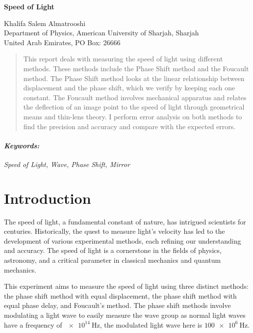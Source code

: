 \documentclass[12pt]{article}
\begin{document}
	
	\begin{titlepage}
		\begin{center}
			\begin{Large}
				\textbf{Speed of Light} \\
			\end{Large}
			\vspace{0.5cm}
			Khalifa Salem Almatrooshi \\
			\vspace{0.5cm}
			Department of Physics, American University of Sharjah, Sharjah \\
			United Arab Emirates, PO Box: 26666
		\end{center}
		\begin{abstract}
			\noindent
			This report deals with measuring the speed of light using different methods. These methods include the Phase Shift method and the Foucault method. The Phase Shift method looks at the linear relationship between displacement and the phase shift, which we verify by keeping each one constant. The Foucault method involves mechanical apparatus and relates the deflection of an image point to the speed of light through geometrical means and thin-lens theory. I perform error analysis on both methods to find the precision and accuracy and compare with the expected errors.
		\end{abstract}
		\paragraph{\textit{Keywords:}} \textit{Speed of Light, Wave, Phase Shift, Mirror}
	\end{titlepage}
	
\clearpage
	
	\section{Introduction}
	
	The speed of light, a fundamental constant of nature, has intrigued scientists for centuries. Historically, the quest to measure light's velocity has led to the development of various experimental methods, each refining our understanding and accuracy. The speed of light is a cornerstone in the fields of physics, astronomy, and a critical parameter in classical mechanics and quantum mechanics.
	
	This experiment aims to measure the speed of light using three distinct methods: the phase shift method with equal displacement, the phase shift method with equal phase delay, and Foucault's method. The phase shift methods involve modulating a light wave to easily measure the wave group as normal light waves have a frequency of $\qty{e14}{\hertz}$, the modulated light wave here is $\qty{100e6}{\hertz}$.
	
\end{document}
